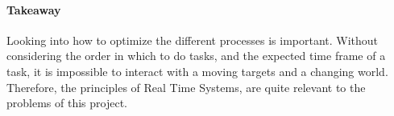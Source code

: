 \paragraph{Takeaway}
Looking into how to optimize the different processes is important.
Without considering the order in which to do tasks, and the expected time frame of a task, it is impossible to interact with a moving targets and a changing world. 
Therefore, the principles of Real Time Systems, are quite relevant to the problems of this project.


